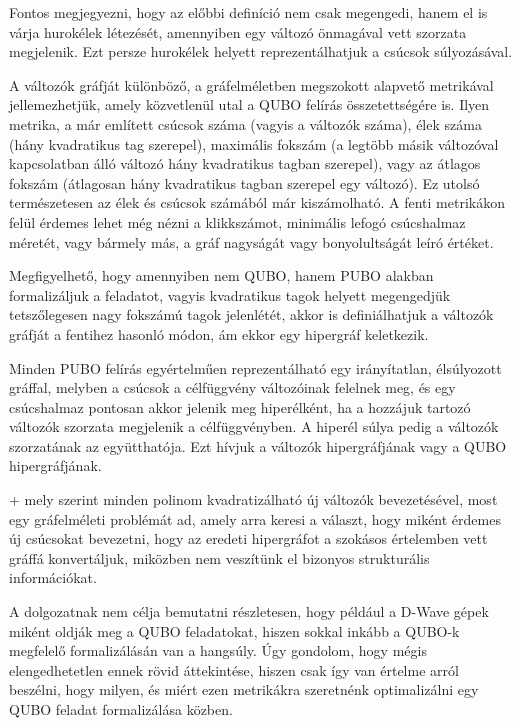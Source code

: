 Fontos megjegyezni, hogy az előbbi definíció nem csak megengedi, hanem el is várja hurokélek létezését, amennyiben egy változó önmagával vett szorzata megjelenik. Ezt persze hurokélek helyett reprezentálhatjuk a csúcsok súlyozásával.

A változók gráfját különböző, a gráfelméletben megszokott alapvető metrikával jellemezhetjük, amely közvetlenül utal a QUBO felírás összetettségére is. Ilyen metrika, a már említett csúcsok száma (vagyis a változók száma), élek száma (hány kvadratikus tag szerepel), maximális fokszám (a legtöbb másik változóval kapcsolatban álló változó hány kvadratikus tagban szerepel), vagy az átlagos fokszám (átlagosan hány kvadratikus tagban szerepel egy változó). Ez utolsó természetesen az élek és csúcsok számából már kiszámolható. A fenti metrikákon felül érdemes lehet még nézni a klikkszámot, minimális lefogó csúcshalmaz méretét, vagy bármely más, a gráf nagyságát vagy bonyolultságát leíró értéket.

Megfigyelhető, hogy amennyiben nem QUBO, hanem PUBO alakban formalizáljuk a feladatot, vagyis kvadratikus tagok helyett megengedjük tetszőlegesen nagy fokszámú tagok jelenlétét, akkor is definiálhatjuk a változók gráfját a fentihez hasonló módon, ám ekkor egy hipergráf keletkezik.

\begin{definition}\label{def:valtozokhipergrafja}
	Minden PUBO felírás egyértelműen reprezentálható egy irányítatlan, élsúlyozott gráffal, melyben a csúcsok a célfüggvény változóinak felelnek meg, és egy csúcshalmaz pontosan akkor jelenik meg hiperélként, ha a hozzájuk tartozó változók szorzata megjelenik a célfüggvényben. A hiperél súlya pedig a változók szorzatának az együtthatója. Ezt hívjuk a változók hipergráfjának vagy a QUBO hipergráfjának.
\end{definition}

\Az+ mely szerint minden polinom kvadratizálható új változók bevezetésével, most egy gráfelméleti problémát ad, amely arra keresi a választ, hogy miként érdemes új csúcsokat bevezetni, hogy az eredeti hipergráfot a szokásos értelemben vett gráffá konvertáljuk, miközben nem veszítünk el bizonyos strukturális információkat.


A dolgozatnak nem célja bemutatni részletesen, hogy például a D-Wave gépek miként oldják meg a QUBO feladatokat, hiszen sokkal inkább a QUBO-k megfelelő formalizálásán van a hangsúly. Úgy gondolom, hogy mégis elengedhetetlen ennek rövid áttekintése, hiszen csak így van értelme arról beszélni, hogy milyen, és miért ezen metrikákra szeretnénk optimalizálni egy QUBO feladat formalizálása közben.

